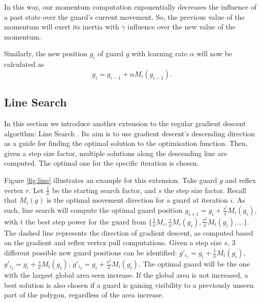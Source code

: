 In this way, our momentum computation exponentially decreases the influence of a past state over the guard's current movement. So, the previous value of the momentum will exert its inertia with $\gamma$ influence over the new value of the momentum.

Similarly, the new position $g_i$ of guard $g$ with learning rate $\alpha$ will now be calculated as $$g_i = g_{i - 1} + \alpha M_i(g_{i - 1}).$$

\subsection{Line Search}
\label{sec:line_search}
In this section we introduce another extension to the regular gradient descent algorithm: Line Search \cite{swann1969survey}. Its aim is to use gradient descent's descending direction as a guide for finding the optimal solution to the optimisation function. Then, given a step size factor, multiple solutions along the descending line are computed. The optimal one for the specific iteration is chosen.

Figure \ref{fig:line} illustrates an example for this extension. Take guard $g$ and reflex vertex $r$. Let $\frac 1 x$ be the starting search factor, and $s$ the step size factor. Recall that $M_i(g)$ is the optimal movement direction for a guard at iteration $i$. As such, line search will compute the optimal guard position $g_{i + 1} = g_i + \frac{s^t}{x}M_i(g_i),$ with $t$ the best step power for the guard from $\{\frac 1 xM_i, \frac{s}{x}M_i(g_i), \frac{s^2}{x}M_i(g_i), ...\}$. The dashed line represents the direction of gradient descent, as computed based on the gradient and reflex vertex pull computations. Given a step size $s$, 3 different possible new guard positions can be identified: $g'_{i_1} = g_i + \frac 1 xM_i(g_i)$,  $g'_{i_2} = g_i + \frac s x M_i(g_i)$, $g'_{i_3} = g_i + \frac{s^2}{x} M_i(g_i)$.
The optimal guard will be the one with the largest global area seen increase. If the global area is not increased, a best solution is also chosen if a guard is gaining visibility to a previously unseen part of the polygon, regardless of the area increase.

